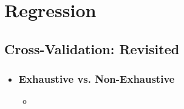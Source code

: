 \chapter{Regression}

\section{Cross-Validation: Revisited}
\begin{itemize}
  \item[]

  \subsection{Exhaustive vs. Non-Exhaustive}
  \begin{itemize}
    \item 
  \end{itemize}
  
\end{itemize}


